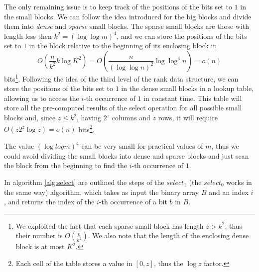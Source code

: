 The only remaining issue is to keep track of the positions of the bits set to $1$ in the small blocks. We can follow the idea introduced for the big blocks and divide them into \emph{dense} and \emph{sparse} small blocks. The sparse small blocks are those with length less then $k^2 = (\log \log m)^4$, and we can store the positions of the bits set to $1$ in the block relative to the beginning of its enclosing block in
\[
    O\left(\frac{n}{k^2} k \log K^2 \right) = O\left(\frac{n}{(\log \log n)^2} \log \log^4 n\right) = o(n)
\]
bits\footnote{
    We exploited the fact that each sparse small block has length $z > k^2$, thus their number is $O(\frac{n}{k^2})$. We also note that the length of the enclosing dense block is at most $K^2$.
}. Following the idea of the third level of the rank data structure, we can store the positions of the bits set to $1$ in the dense small blocks in a lookup table, allowing us to access the $i$-th occurrence of $1$ in constant time. This table will store all the pre-computed results of the select operation for all possible small blocks and, since $z \leq k^2$, having $2^z$ columns and $z$ rows, it will require $O(z 2^z \log z) = o(n)$ bits\footnote{
    Each cell of the table stores a value in $[0, z]$, thus the $\log z$ factor.
}.

\begin{remark}
    The value $(\log log m)^4$ can be very small for practical values of $m$, thus we could avoid dividing the small blocks into dense and sparse blocks and just scan the block from the beginning to find the $i$-th occurrence of $1$.
\end{remark}

In algorithm \ref{alg:select} are outlined the steps of the $select_1$ (the $select_0$ works in the same way) algorithm, which takes as input the binary array $B$ and an index $i$, and returns the index of the $i$-th occurrence of a bit $b$ in $B$.

